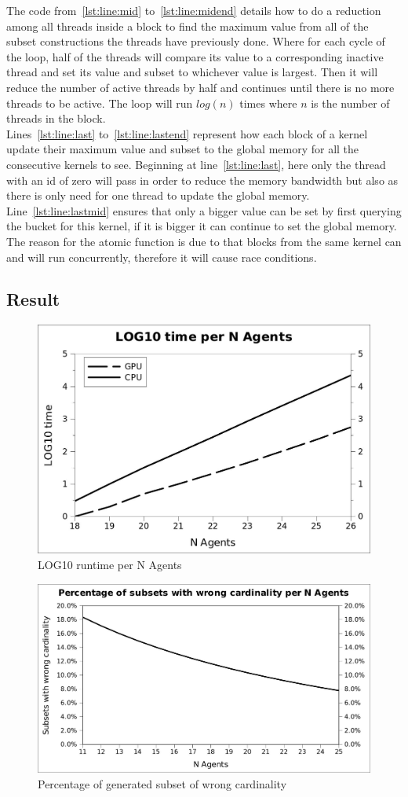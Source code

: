 \documentclass[a4paper, 12pt]{report}
\begin{document}
The code from~\ref{lst:line:mid} to~\ref{lst:line:midend} details how to do a reduction among all threads inside a block to find the maximum value from all of the subset constructions the threads have previously done. Where for each cycle of the loop, half of the threads will compare its value to a corresponding inactive thread and set its value and subset to whichever value is largest. Then it will reduce the number of active threads by half and continues until there is no more threads to be active. The loop will run $log(n)$ times where $n$ is the number of threads in the block.\\

Lines~\ref{lst:line:last} to~\ref{lst:line:lastend} represent how each block of a kernel update their maximum value and subset to the global memory for all the consecutive kernels to see. Beginning at line~\ref{lst:line:last}, here only the thread with an id of zero will pass in order to reduce the memory bandwidth but also as there is only need for one thread to update the global memory. Line~\ref{lst:line:lastmid} ensures that only a bigger value can be set by first querying the bucket for this kernel, if it is bigger it can continue to set the global memory. The reason for the atomic function is due to that blocks from the same kernel can and will run concurrently, therefore it will cause race conditions.
\newpage
\subsection*{Result}
\begin{figure}[htb]
\centering
\includegraphics[width=0.7\linewidth]{loggraph.jpg}
\caption{LOG10 runtime per N Agents\label{log}}
\end{figure}
\begin{figure}[htb]
\centering
\includegraphics[width=0.7\linewidth]{subset.jpg}
\caption{Percentage of generated subset of wrong cardinality\label{overhead}}
\end{figure}
\end{document}
